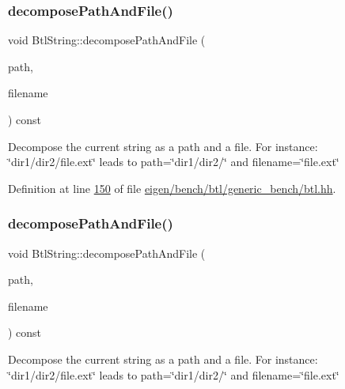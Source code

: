 \subsubsection{\texorpdfstring{decompose\+Path\+And\+File()}{decomposePathAndFile()}\hspace{0.1cm}{\footnotesize\ttfamily [1/2]}}
{\footnotesize\ttfamily void Btl\+String\+::decompose\+Path\+And\+File (\begin{DoxyParamCaption}\item[{\hyperlink{class_btl_string}{Btl\+String} \&}]{path,  }\item[{\hyperlink{class_btl_string}{Btl\+String} \&}]{filename }\end{DoxyParamCaption}) const\hspace{0.3cm}{\ttfamily [inline]}}

Decompose the current string as a path and a file. For instance\+: \char`\"{}dir1/dir2/file.\+ext\char`\"{} leads to path=\char`\"{}dir1/dir2/\char`\"{} and filename=\char`\"{}file.\+ext\char`\"{} 

Definition at line \hyperlink{eigen_2bench_2btl_2generic__bench_2btl_8hh_source_l00150}{150} of file \hyperlink{eigen_2bench_2btl_2generic__bench_2btl_8hh_source}{eigen/bench/btl/generic\+\_\+bench/btl.\+hh}.

\mbox{\label{class_btl_string_a111377f6625fffeed8f02992fd164730}} 
\subsubsection{\texorpdfstring{decompose\+Path\+And\+File()}{decomposePathAndFile()}\hspace{0.1cm}{\footnotesize\ttfamily [2/2]}}
{\footnotesize\ttfamily void Btl\+String\+::decompose\+Path\+And\+File (\begin{DoxyParamCaption}\item[{\hyperlink{class_btl_string}{Btl\+String} \&}]{path,  }\item[{\hyperlink{class_btl_string}{Btl\+String} \&}]{filename }\end{DoxyParamCaption}) const\hspace{0.3cm}{\ttfamily [inline]}}

Decompose the current string as a path and a file. For instance\+: \char`\"{}dir1/dir2/file.\+ext\char`\"{} leads to path=\char`\"{}dir1/dir2/\char`\"{} and filename=\char`\"{}file.\+ext\char`\"{} 

